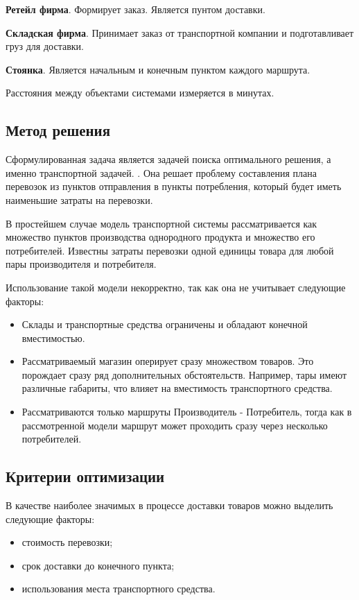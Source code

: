 \textbf{Ретейл фирма}. Формирует заказ. Является пунтом доставки.

\textbf{Складская фирма}. Принимает заказ от транспортной компании и подготавливает груз для доставки.

\textbf{Стоянка}. Является начальным и конечным пунктом каждого маршрута.

Расстояния между объектами системами измеряется в минутах.

\subsection{Метод решения}
Сформулированная задача является задачей поиска оптимального решения, а именно транспортной задачей. \cite{trans:main}. Она решает проблему составления плана перевозок из пунктов отправления в пункты потребления, который будет иметь наименьшие затраты на перевозки. 

В простейшем случае модель транспортной системы рассматривается как множество пунктов производства однородного продукта и множество его потребителей. Известны затраты перевозки одной единицы товара для любой пары производителя и потребителя.

Использование такой модели некорректно, так как она не учитывает следующие факторы:
\begin{itemize}
	\item Склады и транспортные средства ограничены и обладают конечной вместимостью.
	\item Рассматриваемый магазин оперирует сразу множеством товаров. Это порождает сразу ряд дополнительных обстоятельств. Например, тары имеют различные габариты, что влияет на вместимость транспортного средства.
	\item Рассматриваются только маршруты Производитель - Потребитель, тогда как в рассмотренной модели маршрут может проходить сразу через несколько потребителей.
\end{itemize}


\subsection{Критерии оптимизации}
В качестве наиболее значимых в процессе доставки товаров можно выделить следующие факторы:
\begin{itemize}
	\item стоимость перевозки;
	\item срок доставки до конечного пункта;
	\item использования места транспортного средства.
\end{itemize}

\pagebreak